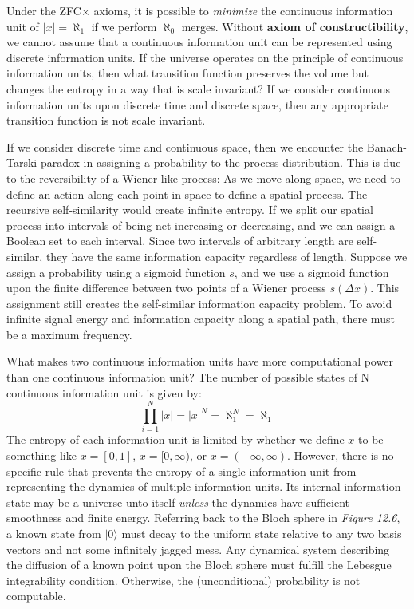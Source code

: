 \documentclass[10pt, a5paper, twoside, openright]{memoir}
\begin{document}
Under the ZFC$\times$ axioms, it is possible to \textit{minimize} the continuous information unit of $|x| = \aleph_1$ if we perform $\aleph_0$ merges. Without \textbf{axiom of constructibility}, we cannot assume that a continuous information unit can be represented using discrete information units. If the universe operates on the principle of continuous information units, then what transition function preserves the volume but changes the entropy in a way that is scale invariant? If we consider continuous information units upon discrete time and discrete space, then any appropriate transition function is not scale invariant. 

If we consider discrete time and continuous space, then we encounter the Banach-Tarski paradox in assigning a probability to the process distribution. This is due to the reversibility of a Wiener-like process: As we move along space, we need to define an action along each point in space to define a spatial process. The recursive self-similarity would create infinite entropy. If we split our spatial process into intervals of being net increasing or decreasing, and we can assign a Boolean set to each interval. Since two intervals of arbitrary length are self-similar, they have the same information capacity regardless of length. Suppose we assign a probability using a sigmoid function $s$, and we use a sigmoid function upon the finite difference between two points of a Wiener process $s(\Delta x)$. This assignment still creates the self-similar information capacity problem. To avoid infinite signal energy and information capacity along a spatial path, there must be a maximum frequency.

What makes two continuous information units have more computational power than one continuous information unit? The number of possible states of N continuous information unit is given by:
$$\prod\limits_{i=1}^N |x| = |x|^N = \aleph_1^N = \aleph_1$$
The entropy of each information unit is limited by whether we define $x$ to be something like $x = [0,1]$, $x = [0, \infty)$, or $x = (-\infty, \infty)$. However, there is no specific rule that prevents the entropy of a single information unit from representing the dynamics of multiple information units. Its internal information state may be a universe unto itself \textit{unless} the dynamics have sufficient smoothness and finite energy. Referring back to the Bloch sphere in \textit{Figure 12.6}, a known state from $| 0 \rangle$ must decay to the uniform state relative to any two basis vectors and not some infinitely jagged mess. Any dynamical system describing the diffusion of a known point upon the Bloch sphere must fulfill the Lebesgue integrability condition. Otherwise, the (unconditional) probability is not computable.
\end{document}
